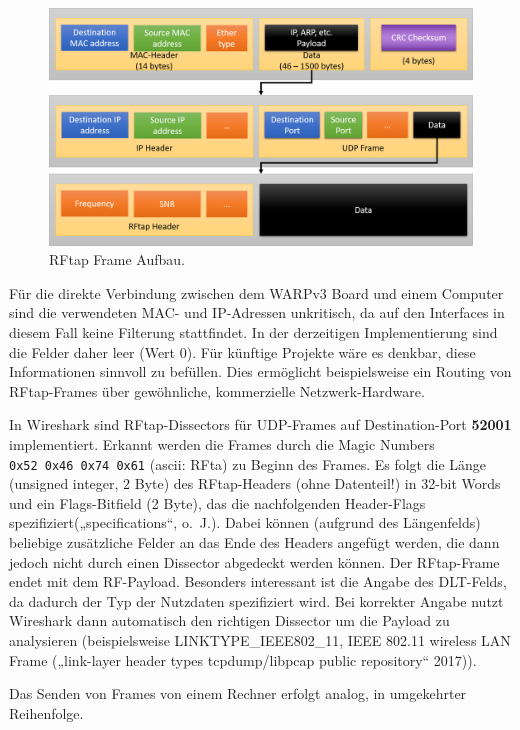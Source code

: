\documentclass[ngerman,]{scrartcl}
\begin{document}
\begin{figure}
\centering
\includegraphics{rftap.png}
\caption{RFtap Frame Aufbau.\label{fig:rftap}}
\end{figure}

Für die direkte Verbindung zwischen dem WARPv3 Board und einem Computer
sind die verwendeten MAC- und IP-Adressen unkritisch, da auf den
Interfaces in diesem Fall keine Filterung stattfindet. In der
derzeitigen Implementierung sind die Felder daher leer (Wert 0). Für
künftige Projekte wäre es denkbar, diese Informationen sinnvoll zu
befüllen. Dies ermöglicht beispielsweise ein Routing von RFtap-Frames
über gewöhnliche, kommerzielle Netzwerk-Hardware.

In Wireshark sind RFtap-Dissectors für UDP-Frames auf Destination-Port
\textbf{52001} implementiert. Erkannt werden die Frames durch die Magic
Numbers \texttt{0x52\ 0x46\ 0x74\ 0x61} (ascii: RFta) zu Beginn des
Frames. Es folgt die Länge (unsigned integer, 2 Byte) des RFtap-Headers
(ohne Datenteil!) in 32-bit Words und ein Flags-Bitfield (2 Byte), das
die nachfolgenden Header-Flags spezifiziert(„specifications``, o.~J.).
Dabei können (aufgrund des Längenfelds) beliebige zusätzliche Felder an
das Ende des Headers angefügt werden, die dann jedoch nicht durch einen
Dissector abgedeckt werden können. Der RFtap-Frame endet mit dem
RF-Payload. Besonders interessant ist die Angabe des DLT-Felds, da
dadurch der Typ der Nutzdaten spezifiziert wird. Bei korrekter Angabe
nutzt Wireshark dann automatisch den richtigen Dissector um die Payload
zu analysieren (beispielsweise LINKTYPE\_IEEE802\_11, IEEE 802.11
wireless LAN Frame („link-layer header types \textbar{} tcpdump/libpcap
public repository`` 2017)).

Das Senden von Frames von einem Rechner erfolgt analog, in umgekehrter
Reihenfolge.
\end{document}
